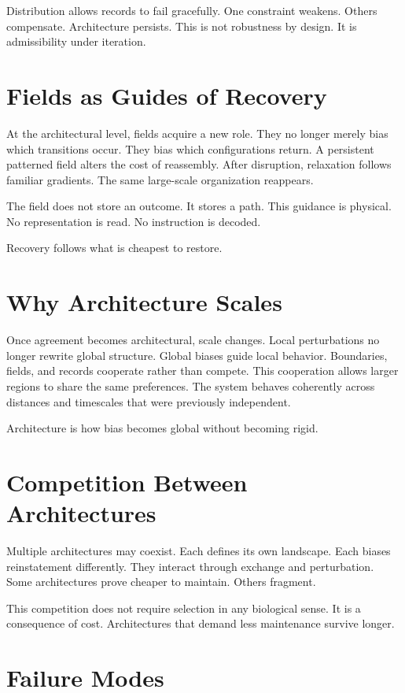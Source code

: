\documentclass[11pt,twoside,openright]{book}
\begin{document}
Distribution allows records to fail gracefully. One constraint weakens. Others compensate. Architecture persists. This is not robustness by design. It is admissibility under iteration.

\section*{Fields as Guides of Recovery}

At the architectural level, fields acquire a new role. They no longer merely bias which transitions occur. They bias which configurations return. A persistent patterned field alters the cost of reassembly. After disruption, relaxation follows familiar gradients. The same large-scale organization reappears.

The field does not store an outcome. It stores a path. This guidance is physical. No representation is read. No instruction is decoded.

Recovery follows what is cheapest to restore.

\section*{Why Architecture Scales}

Once agreement becomes architectural, scale changes. Local perturbations no longer rewrite global structure. Global biases guide local behavior. Boundaries, fields, and records cooperate rather than compete. This cooperation allows larger regions to share the same preferences. The system behaves coherently across distances and timescales that were previously independent.

Architecture is how bias becomes global without becoming rigid.

\section*{Competition Between Architectures}

Multiple architectures may coexist. Each defines its own landscape. Each biases reinstatement differently. They interact through exchange and perturbation. Some architectures prove cheaper to maintain. Others fragment.

This competition does not require selection in any biological sense. It is a consequence of cost. Architectures that demand less maintenance survive longer.

\section*{Failure Modes}
\end{document}
